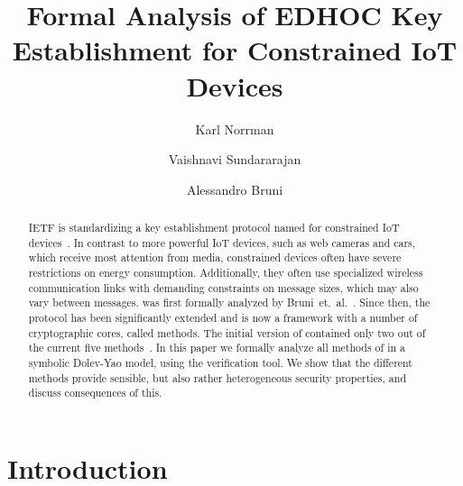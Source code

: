 \documentclass[runningheads, envcountsame, a4paper, draft, x11names]{llncs}
\newcommand{\fillhack}{\vspace{-0.5em}}
\begin{document}
\title{Formal Analysis of EDHOC Key Establishment for Constrained IoT Devices}
\author{Karl Norrman \and
Vaishnavi Sundararajan \and
Alessandro Bruni
}
%
%
%
\maketitle
%

\begin{abstract}
    IETF is standardizing a key establishment protocol named \mEdhoc{} for
constrained IoT devices~\cite{selander-lake-edhoc-01}.
%
In contrast to more powerful IoT devices, such as web cameras and cars,
which receive most attention from media, constrained devices often have severe
restrictions on energy consumption.
%
Additionally, they often use specialized wireless communication links with
demanding constraints on message sizes, which may also vary between messages.
%
\mEdhoc{} was first formally analyzed by
Bruni~et.~al.~\cite{DBLP:conf/secsr/BruniJPS18}.
%
Since then, the protocol has been significantly extended and is now a
framework with a number of cryptographic cores, called methods.
%
The initial version of \mEdhoc{} contained only two out of the current five
methods~\cite{selander-ace-cose-ecdhe-08}.
%
In this paper we formally analyze all methods of \mEdhoc{} in a symbolic
Dolev-Yao model, using the \mTamarin{} verification tool.
%
We show that the different methods provide sensible, but also rather
heterogeneous security properties, and discuss consequences of this.
%
\end{abstract}
%

\vspace{-2.5em}
\section{Introduction}
\label{sec:introduction}
\fillhack
\end{document}
